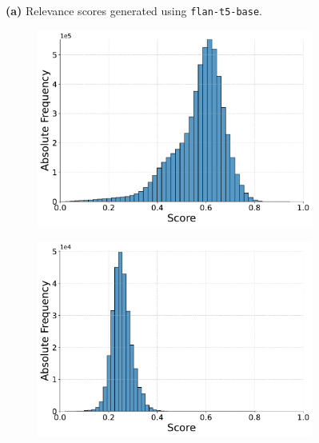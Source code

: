 \begin{figure}[ht!]
    \vspace{-0.5cm}
    \textbf{(a)} Relevance scores generated using \texttt{flan-t5-base}.
    \vspace{0.5cm}

    \begin{subfigure}[b]{0.49\textwidth}
        \centering
        \includegraphics[width=\textwidth]{graphics/seaborn/pairwise_cw22_score_distribution_flan-t5-small.pdf}
        \label{fig:pairwise_flan-t5-small}
    \end{subfigure}
    \hfill
    \begin{subfigure}[b]{0.49\textwidth}
        \centering
        \includegraphics[width=\textwidth]{graphics/seaborn/pointwise_cw22_score_distribution_flan-t5-small.pdf}
        \label{fig:pointwise_flan-t5-small}
    \end{subfigure}


\end{figure}
